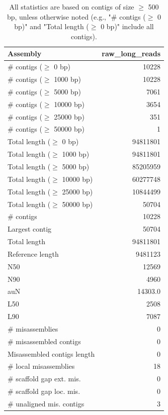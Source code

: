 \documentclass[12pt,a4paper]{article}
\begin{document}
\begin{table}[ht]
\begin{center}
\caption{All statistics are based on contigs of size $\geq$ 500 bp, unless otherwise noted (e.g., "\# contigs ($\geq$ 0 bp)" and "Total length ($\geq$ 0 bp)" include all contigs).}
\begin{tabular}{|l*{1}{|r}|}
\hline
Assembly & raw\_long\_reads \\ \hline
\# contigs ($\geq$ 0 bp) & 10228 \\ \hline
\# contigs ($\geq$ 1000 bp) & 10228 \\ \hline
\# contigs ($\geq$ 5000 bp) & 7061 \\ \hline
\# contigs ($\geq$ 10000 bp) & 3654 \\ \hline
\# contigs ($\geq$ 25000 bp) & 351 \\ \hline
\# contigs ($\geq$ 50000 bp) & 1 \\ \hline
Total length ($\geq$ 0 bp) & 94811801 \\ \hline
Total length ($\geq$ 1000 bp) & 94811801 \\ \hline
Total length ($\geq$ 5000 bp) & 85205959 \\ \hline
Total length ($\geq$ 10000 bp) & 60277748 \\ \hline
Total length ($\geq$ 25000 bp) & 10844499 \\ \hline
Total length ($\geq$ 50000 bp) & 50704 \\ \hline
\# contigs & 10228 \\ \hline
Largest contig & 50704 \\ \hline
Total length & 94811801 \\ \hline
Reference length & 9481123 \\ \hline
N50 & 12569 \\ \hline
N90 & 4960 \\ \hline
auN & 14303.0 \\ \hline
L50 & 2508 \\ \hline
L90 & 7087 \\ \hline
\# misassemblies & 0 \\ \hline
\# misassembled contigs & 0 \\ \hline
Misassembled contigs length & 0 \\ \hline
\# local misassemblies & 18 \\ \hline
\# scaffold gap ext. mis. & 0 \\ \hline
\# scaffold gap loc. mis. & 0 \\ \hline
\# unaligned mis. contigs & 3 \\ \hline

\end{tabular}
\end{center}
\end{table}
\end{document}

